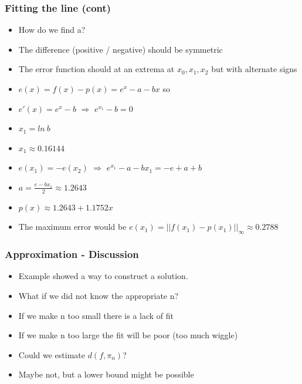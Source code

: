 \documentclass[10pt]{beamer}
\begin{document}
\begin{frame}
  \frametitle{Fitting the line (cont)}
  \begin{itemize}
  \item How do we find a? 
  \item The difference (positive / negative) should be symmetric
  \item The error function should at an extrema at $x_0, x_1, x_2$ but with alternate signs
  \item $e(x) = f(x) - p(x) = e^x - a - b x$ so 
  \item $e'(x) = e^x - b$ $\Rightarrow$ $ e^{x_1} -b = 0$
  \item $x_1 = ln ~ b$
  \item $x_1 \approx 0.16144$ \pause
  \item $e(x_1) = -e(x_2)$ $\Rightarrow$ $e^{x_1} - a - b x_1 = -e + a + b$
  \item $a = \frac{e-b x_1}{2} \approx 1.2643$
  \item $p(x) \approx 1.2643 + 1.1752 x$
  \item The maximum error would be $e(x_1) = ||f(x_1) - p(x_1)||_{\infty} \approx 0.2788$    
  \end{itemize}
\end{frame}

\begin{frame}
  \frametitle{Approximation - Discussion}
  \begin{itemize}
  \item Example showed a way to construct a solution.
  \item What if we did not know the appropriate n?
  \item If we make n too small there is a lack of fit
  \item If we make n too large the fit will be poor (too much wiggle)
  \item Could we estimate $d(f, \pi_n)$? 
  \item Maybe not, but a lower bound might be possible    
  \end{itemize}
\end{frame}
\end{document}
